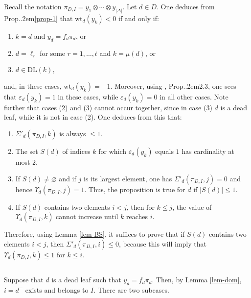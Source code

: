 \documentclass[12pt]{amsart}
\numberwithin{equation}{section}
\theoremstyle{definition}
\def\Prop{Prop.\kern.2em}
\def\DL{\mathrm{DL}}  %
\def\wt{\mathrm{wt}}  %
\let\vep\varepsilon
\begin{document}
\smallskip 
Recall the notation $\pi_{D, I} = y_1 \otimes \cdots \otimes y_{\vert \Delta \vert}$. Let $d\in D$. One deduces from 
\Prop \ref{prop-1} that $\wt_d(y_k) < 0$ if and only if: 
\begin{enumerate} 
\item $k=d$ and $y_d = f_d \pi_d$, or 

\smallskip 
\item $d = \ell_r$ for some $r=1,\dots, t$ and $k = \mu(d)$, or 

\smallskip
\item $d\in \DL(k)$, 
\end{enumerate} 
and, in these cases, $\wt_d(y_k) = -1$. Moreover, using  \cite{BG25}, \Prop 2.3, one sees that 
$\vep_d(y_k) = 1$ in these cases, while $\vep_d(y_k) = 0$ in all other cases. 
Note further that cases (2) and (3) cannot occur together, since in case (3) $d$ is a dead leaf, while it is not 
in case (2). 
One deduces from this that: 
\begin{enumerate}
\item $\Sigma'_d(\pi_{D,I},k)$ is always $\leq 1$. 

\item The set $S(d)$ of indices $k$ for which $\vep_d(y_k)$ equals $1$ has cardinality at most $2$. 

\item If $S(d)\not=\varnothing$ and if $j$ is its largest element, one has $\Sigma'_d(\pi_{D,I},j) = 0$ and hence 
$\Upsilon_d(\pi_{D,I},j) = 1$. 
Thus, the proposition is true for $d$ if $\vert S(d)\vert \leq 1$. 

\item If $S(d)$ contains two elements $i < j$, then 
for $k \leq j$, the value of $\Upsilon_d(\pi_{D,I},k)$ cannot increase until $k$ reaches $i$. 
\end{enumerate} 

Therefore, using Lemma \ref{lem-BS}, it suffices to prove that if $S(d)$ contains two elements $i < j$, 
then $\Sigma'_d(\pi_{D,I},i) \leq 0$, because this will imply that $\Upsilon_d(\pi_{D,I},k) \leq 1$ for $k\leq i$. 

\subsection{}\label{subsec-dead} 
Suppose that $d$ is a dead leaf such that $y_d = f_d \pi_d$. 
Then, by Lemma \ref{lem-dom}, $i = d^-$ exists and belongs to $I$. 
There are two subcases. 
\end{document}

